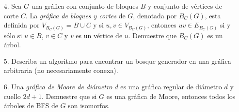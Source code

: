 \documentclass{article}
\begin{document}
\begin{enumerate}
\item[$4$.] Sea $G$ una gr\'afica con conjunto de bloques $B$ y conjunto de
  v\'ertices de corte $C$.   La {\em gr\'afica de bloques y cortes} de $G$,
  denotada por $B_C (G)$, esta definida por $V_{B_C (G)} = B \cup C$ y
  si $u, v \in V_{B_C (G)}$, entonces $uv \in E_{B_C (G)}$ si y s\'olo si
  $u \in B$, $v \in C$ y $v$ es un v\'ertice de $u$.   Demuestre que
  $B_C (G)$ es un \'arbol.
  
\item[$5$.] Describa un algoritmo para encontrar un bosque generador en una
  gr\'afica arbitraria (no necesariamente conexa).
  
\item[$6$.] Una {\em gr\'afica de Moore de di\'ametro $d$} es una gr\'afica
  regular de di\'ametro $d$ y cuello $2d+1$.   Demuestre que si $G$ es
  una gr\'afica de Moore, entonces todos los \'arboles de BFS de $G$
  son isomorfos.

\end{enumerate}
\end{document}
